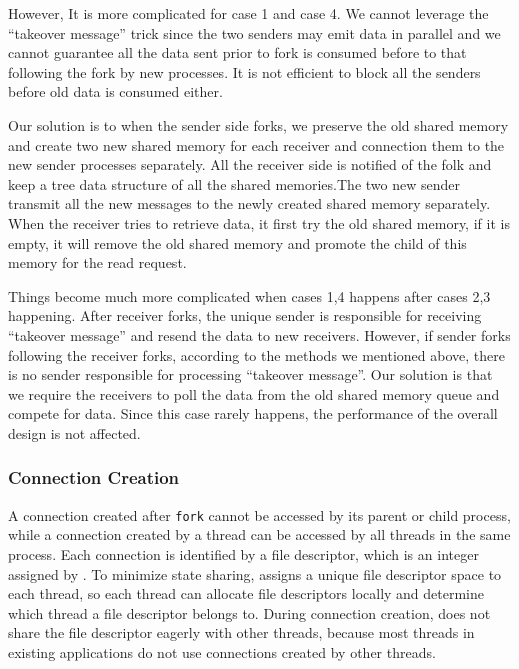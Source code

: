 However, It is more complicated for case 1 and case 4. We cannot leverage the ``takeover message'' trick since the two senders may emit data in parallel and we cannot guarantee all the data sent prior to fork is consumed before to that following the fork by new processes. It is not efficient to block all the senders before old data is consumed either.

Our solution is to when the sender side forks, we preserve the old shared memory and create two new shared memory for each receiver and connection them to the new sender processes separately. All the receiver side is notified of the folk and keep a tree data structure of all the shared memories.The two new sender transmit all the new messages to the newly created shared memory separately. When the receiver tries to retrieve data, it first try the old shared memory, if it is empty, it will remove the old shared memory and promote the child of this memory for the read request. 

Things become much more complicated when cases 1,4 happens after cases 2,3 happening. After receiver forks, the unique sender is responsible for receiving ``takeover message'' and resend the data to new receivers. However, if sender forks following the receiver forks, according to the methods we mentioned above, there is no sender responsible for processing ``takeover message''. Our solution is that we require the receivers to poll the data from the old shared memory queue and compete for data. Since this case rarely happens, the performance of the overall design is not affected.

\subsubsection{Connection Creation}
\label{subsubsec:fork_new}

A connection created after \texttt{fork} cannot be accessed by its parent or child process, while a connection created by a thread can be accessed by all threads in the same process. Each connection is identified by a file descriptor, which is an integer assigned by \libipc. To minimize state sharing, \libipc assigns a unique file descriptor space to each thread, so each thread can allocate file descriptors locally and determine which thread a file descriptor belongs to. During connection creation, \libipc does not share the file descriptor eagerly with other threads, because most threads in existing applications do not use connections created by other threads.

